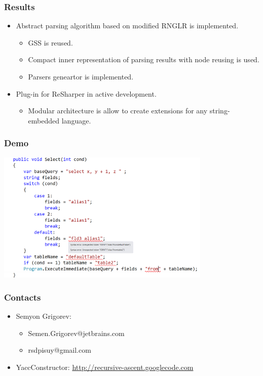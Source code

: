 \documentclass{beamer}
\begin{document}
\begin{frame}[fragile]
	\transwipe[direction=90]
	\frametitle{Results}
	\begin{itemize}
	    \item Abstract parsing algorithm based on modified RNGLR is implemented.
	    \begin{itemize}
	        \item GSS is reused.
	        \item Compact inner representation of parsing results with node reusing is used.
            \item Parsers geneartor is implemented.
        \end{itemize}
	    \item Plug-in for ReSharper in active development.
	    \begin{itemize}
	        \item  Modular architecture is allow to create extensions for any string-embedded language.
        \end{itemize}
	\end{itemize}
\end{frame}

\begin{frame}[fragile]
	\transwipe[direction=90]
	\frametitle{Demo}
	\begin{center}
	    \includegraphics[width=290pt]{Screen1.png}
	\end{center}
\end{frame}

\begin{frame}
	\transwipe[direction=90]
	\frametitle{Contacts}
	\begin{itemize}
		\item Semyon Grigorev:
		\begin{itemize}
    		\item Semen.Grigorev@jetbrains.com
    		\item rsdpisuy@gmail.com
    	\end{itemize}		
		\item YaccConstructor: \href{http://recursive-ascent.googlecode.com}{http://recursive-ascent.googlecode.com}
	\end{itemize}
\end{frame}
\end{document}
